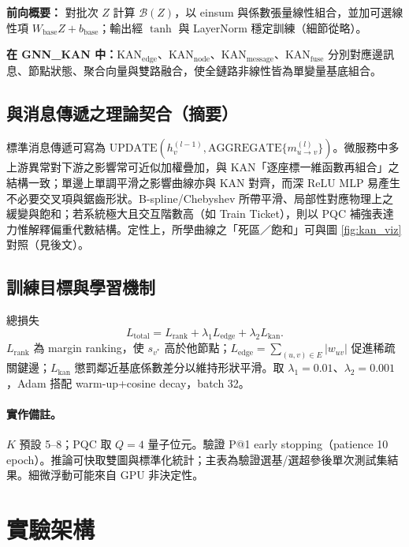 \documentclass[conference]{IEEEtran}
\begin{document}
\textbf{前向概要：} 對批次 $Z$ 計算 $\mathcal{B}(Z)$，以 einsum 與係數張量線性組合，並加可選線性項 $W_{\mathrm{base}}Z+b_{\mathrm{base}}$；輸出經 $\tanh$ 與 LayerNorm 穩定訓練（細節從略）。

\textbf{在 GNN\_KAN 中：}$\mathrm{KAN}_{\mathrm{edge}}$、$\mathrm{KAN}_{\mathrm{node}}$、$\mathrm{KAN}_{\mathrm{message}}$、$\mathrm{KAN}_{\mathrm{fuse}}$ 分別對應邊訊息、節點狀態、聚合向量與雙路融合，使全鏈路非線性皆為單變量基底組合。

\subsection{與消息傳遞之理論契合（摘要）}

標準消息傳遞可寫為 $\mathrm{UPDATE}(h_v^{(l-1)},\mathrm{AGGREGATE}\{m_{u\to v}^{(l)}\})$。微服務中多上游異常對下游之影響常可近似加權疊加，與 KAN「逐座標一維函數再組合」之結構一致；單邊上單調平滑之影響曲線亦與 KAN 對齊，而深 ReLU MLP 易產生不必要交叉項與鋸齒形狀。B-spline/Chebyshev 所帶平滑、局部性對應物理上之緩變與飽和；若系統極大且交互階數高（如 Train Ticket），則以 PQC 補強表達力惟解釋偏重代數結構。定性上，所學曲線之「死區／飽和」可與圖 \ref{fig:kan_viz} 對照（見後文）。

\subsection{訓練目標與學習機制}

總損失
\begin{equation}
L_{\mathrm{total}} = L_{\mathrm{rank}} + \lambda_1 L_{\mathrm{edge}} + \lambda_2 L_{\mathrm{kan}}.
\end{equation}
$L_{\mathrm{rank}}$ 為 margin ranking，使 $s_{v^*}$ 高於他節點；$L_{\mathrm{edge}}=\sum_{(u,v)\in E}|w_{uv}|$ 促進稀疏關鍵邊；$L_{\mathrm{kan}}$ 懲罰鄰近基底係數差分以維持形狀平滑。取 $\lambda_1{=}0.01$、$\lambda_2{=}0.001$，Adam 搭配 warm-up+cosine decay，batch 32。

\paragraph{實作備註。}
$K$ 預設 5--8；PQC 取 $Q{=}4$ 量子位元。驗證 P@1 early stopping（patience 10 epoch）。推論可快取雙圖與標準化統計；主表為驗證選基/選超參後單次測試集結果。細微浮動可能來自 GPU 非決定性。

\section{實驗架構}
\end{document}
